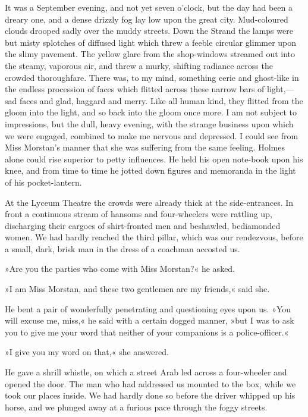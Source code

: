 It was a September evening, and not yet seven o'clock, but the day had been a dreary one, and a dense drizzly fog lay low upon the great city. Mud-coloured clouds drooped sadly over the muddy streets. Down the Strand the lamps were but misty splotches of diffused light which threw a feeble circular glimmer upon the slimy pavement. The yellow glare from the shop-windows streamed out into the steamy, vaporous air, and threw a murky, shifting radiance across the crowded thoroughfare. There was, to my mind, something eerie and ghost-like in the endless procession of faces which flitted across these narrow bars of light,—sad faces and glad, haggard and merry. Like all human kind, they flitted from the gloom into the light, and so back into the gloom once more. I am not subject to impressions, but the dull, heavy evening, with the strange business upon which we were engaged, combined to make me nervous and depressed. I could see from Miss Morstan's manner that she was suffering from the same feeling. Holmes alone could rise superior to petty influences. He held his open note-book upon his knee, and from time to time he jotted down figures and memoranda in the light of his pocket-lantern.

At the Lyceum Theatre the crowds were already thick at the side-entrances. In front a continuous stream of hansoms and four-wheelers were rattling up, discharging their cargoes of shirt-fronted men and beshawled, bediamonded women. We had hardly reached the third pillar, which was our rendezvous, before a small, dark, brisk man in the dress of a coachman accosted us.

»Are you the parties who come with Miss Morstan?« he asked.

»I am Miss Morstan, and these two gentlemen are my friends,« said she.

He bent a pair of wonderfully penetrating and questioning eyes upon us. »You will excuse me, miss,« he said with a certain dogged manner, »but I was to ask you to give me your word that neither of your companions is a police-officer.«

»I give you my word on that,« she answered.

He gave a shrill whistle, on which a street Arab led across a four-wheeler and opened the door. The man who had addressed us mounted to the box, while we took our places inside. We had hardly done so before the driver whipped up his horse, and we plunged away at a furious pace through the foggy streets.

